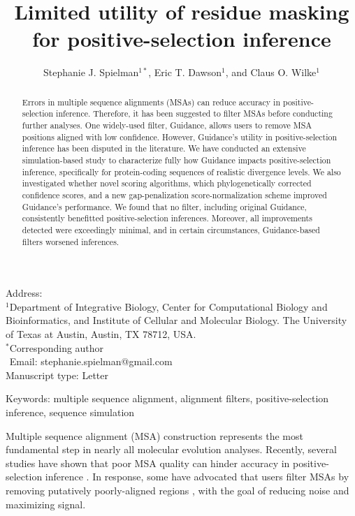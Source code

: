\documentclass[11pt]{article}
\begin{document}
\title{\textbf{Limited utility of residue masking for positive-selection inference}}
\author{Stephanie J. Spielman$^{1*}$, Eric T. Dawson$^{1}$, and Claus O. Wilke$^{1}$}
\date{}

\maketitle
\noindent
Address:\\
$^1$Department of Integrative Biology, Center for Computational Biology and Bioinformatics, and Institute of Cellular and Molecular Biology.
The University of Texas at Austin, Austin, TX 78712, USA.\\

\bigskip
\noindent
$^*$Corresponding author\\
$\phantom{^*}$Email: stephanie.spielman@gmail.com\\

\bigskip
\noindent
Manuscript type: Letter

\bigskip
\noindent Keywords: multiple sequence alignment, alignment filters, positive-selection inference, sequence simulation

\newpage
\begin{abstract}
Errors in multiple sequence alignments (MSAs) can reduce accuracy in positive-selection inference. Therefore, it has been suggested to filter MSAs before conducting further analyses. One widely-used filter, Guidance, allows users to remove MSA positions aligned with low confidence. However, Guidance's utility in positive-selection inference has been disputed in the literature. We have conducted an extensive simulation-based study to characterize fully how Guidance impacts positive-selection inference, specifically for protein-coding sequences of realistic divergence levels. We also investigated whether novel scoring algorithms, which phylogenetically corrected confidence scores, and a new gap-penalization score-normalization scheme improved Guidance's performance. We found that no filter, including original Guidance, consistently benefitted positive-selection inferences. Moreover, all improvements detected were exceedingly minimal, and in certain circumstances, Guidance-based filters worsened inferences.
\end{abstract}

Multiple sequence alignment (MSA) construction represents the most fundamental step in nearly all molecular evolution analyses. Recently, several studies have shown that poor MSA quality can hinder accuracy in positive-selection inference \citep{Schneider2009, Fletcher2010, MarkovaRaina2011}. In response, some have advocated that users filter MSAs by removing putatively poorly-aligned regions \citep{Jordan2012,Privman2012}, with the goal of reducing noise and maximizing signal.
\end{document}
